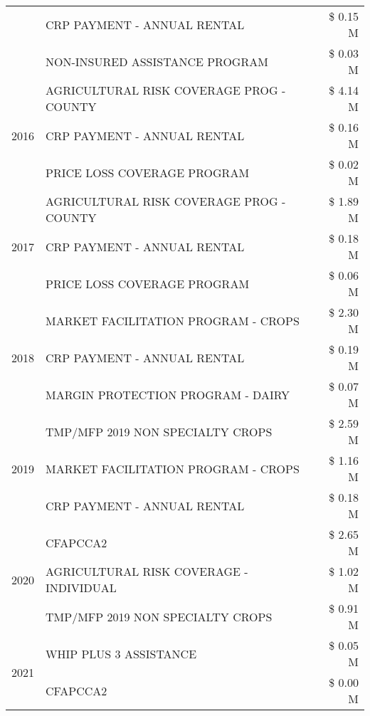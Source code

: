 \begin{tabular}{llr}
 & CRP PAYMENT - ANNUAL RENTAL & \$ 0.15 M \\
 & NON-INSURED ASSISTANCE PROGRAM & \$ 0.03 M \\
\cline{1-3}
\multirow[t]{3}{*}{2016} & AGRICULTURAL RISK COVERAGE PROG - COUNTY      & \$ 4.14 M \\
 & CRP PAYMENT - ANNUAL RENTAL                   & \$ 0.16 M \\
 & PRICE LOSS COVERAGE PROGRAM                   & \$ 0.02 M \\
\cline{1-3}
\multirow[t]{3}{*}{2017} & AGRICULTURAL RISK COVERAGE PROG - COUNTY & \$ 1.89 M \\
 & CRP PAYMENT - ANNUAL RENTAL & \$ 0.18 M \\
 & PRICE LOSS COVERAGE PROGRAM & \$ 0.06 M \\
\cline{1-3}
\multirow[t]{3}{*}{2018} & MARKET FACILITATION PROGRAM - CROPS & \$ 2.30 M \\
 & CRP PAYMENT - ANNUAL RENTAL & \$ 0.19 M \\
 & MARGIN PROTECTION PROGRAM - DAIRY & \$ 0.07 M \\
\cline{1-3}
\multirow[t]{3}{*}{2019} & TMP/MFP 2019 NON SPECIALTY CROPS & \$ 2.59 M \\
 & MARKET FACILITATION PROGRAM - CROPS & \$ 1.16 M \\
 & CRP PAYMENT - ANNUAL RENTAL & \$ 0.18 M \\
\cline{1-3}
\multirow[t]{3}{*}{2020} & CFAPCCA2 & \$ 2.65 M \\
 & AGRICULTURAL RISK COVERAGE - INDIVIDUAL & \$ 1.02 M \\
 & TMP/MFP 2019 NON SPECIALTY CROPS & \$ 0.91 M \\
\cline{1-3}
\multirow[t]{2}{*}{2021} & WHIP PLUS 3 ASSISTANCE & \$ 0.05 M \\
 & CFAPCCA2 & \$ 0.00 M \\
\cline{1-3}
\bottomrule
\end{tabular}
